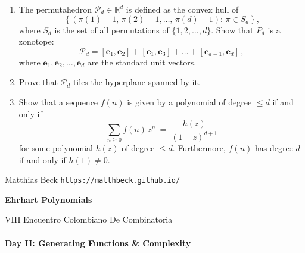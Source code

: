 \documentclass[11pt]{article}
\def\be{\mathbf{e}}
\def\cP{\mathcal{P}}
\def\RR{\mathbb{R}}
\begin{document}
\begin{enumerate}[(1)]
\item The permutahedron $\cP_d \in \RR^d$ is defined as the convex hull of
\[
  \left\{ \left( \pi(1) - 1, \, \pi(2) - 1, \dots, \, \pi(d) - 1 \right) : \, \pi \in S_d \right\} ,
\]
where $S_d$ is the set of all permutations of $\{ 1, 2, \dots, d \}$.
Show that $P_d$ is a zonotope:
\[ \cP_d = [\be_1, \be_2] + [\be_1, \be_3] + \dots + [\be_{ d-1 }, \be_d] \, ,\]
where $\be_1, \be_2, \dots, \be_d$ are the standard unit vectors.

\item Prove that $\cP_d$ tiles the hyperplane spanned by it.

\item Show that a sequence $f(n)$ is given by a polynomial of degree $\le d$ if and only if
    \[
        \sum_{ n \ge 0 } f(n) \, z^n \ = \ \frac{ h(z) }{ (1-z)^{ d+1 } }
    \]
    for some polynomial $h(z)$ of degree $\le d$.  Furthermore, $f(n)$ has
    degree $d$ if and only if $h(1) \ne 0$.

\end{enumerate}


{\sc Matthias Beck} \hfill {\tt https://matthbeck.github.io/}

\newpage
\begin{center}
\Large{\bf Ehrhart Polynomials} 

\normalsize
VIII Encuentro Colombiano De Combinatoria
\end{center}

\paragraph{Day II: Generating Functions \& Complexity}
\end{document}
